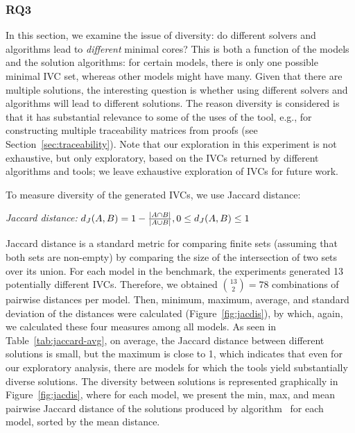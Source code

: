 \subsubsection{RQ3}
In this section, we examine the issue of diversity:
do different solvers and algorithms lead to {\em different} minimal
cores? This is both a function of the models and the solution
algorithms: for certain models, there is only one possible minimal IVC
set, whereas other models might have many. Given that there are
multiple solutions, the interesting question is whether using
different solvers and algorithms will lead to different solutions.
The reason diversity is considered is that it has substantial relevance to
some of the uses of the tool, e.g., for constructing multiple traceability
matrices from proofs (see Section~\ref{sec:traceability}).
Note that our exploration in this experiment is not
exhaustive, but only exploratory, based on the IVCs returned by different
algorithms and tools; we leave exhaustive exploration of
IVCs for future work.


To measure diversity of the generated IVCs, we use Jaccard distance:
\begin{definition}{\emph{Jaccard distance:}}
  \label{def:dj}
  $d_J(\small{A}, \small{B}) = 1 - \frac{|A \cap B|}{|A \cup B|} ,\\ 0 \leq d_J(\small{A}, \small{B}) \leq 1$
\end{definition}
\noindent Jaccard distance is a standard metric for comparing finite
sets (assuming that both sets are non-empty) by comparing the size of
the intersection of two sets over its union. For each model in the
benchmark, the experiments generated 13 potentially different IVCs. Therefore, we
obtained $\binom{13}{2} = 78$ combinations of pairwise distances per
model. Then, minimum, maximum, average, and standard deviation of the
distances were calculated (Figure~\ref{fig:jacdis}), by which, again,
we calculated these four measures among all models. As seen in
Table~\ref{tab:jaccard-avg}, on average, the Jaccard distance between
different solutions is small, but the maximum is close to 1, which
indicates that even for our exploratory analysis, there are models for
which the tools yield substantially diverse solutions. The diversity
between solutions is represented graphically in
Figure~\ref{fig:jacdis}, where for each model, we present the min,
max, and mean pairwise Jaccard distance of the solutions produced by algorithm
\ucalg\ for each model, sorted by the mean distance.

